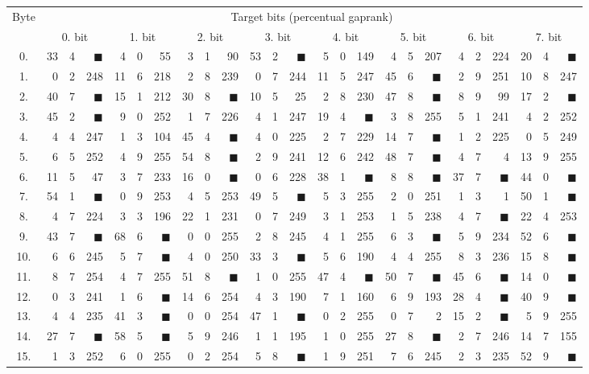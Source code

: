 \begin{tabular}{| c | r@{.} l@{\quad}r | r@{.} l@{\quad}r | r@{.} l@{\quad}r | r@{.} l@{\quad}r | r@{.} l@{\quad}r | r@{.} l@{\quad}r | r@{.} l@{\quad}r | r@{.} l@{\quad}r |}
	\hline
	\multirow{2}{*}{Byte} & \multicolumn{24}{c|}{Target bits (percentual gap\quad rank)} \\
	\cline{2-25}
	~ & \multicolumn{3}{c|}{0. bit} & \multicolumn{3}{c|}{1. bit} & \multicolumn{3}{c|}{2. bit} & \multicolumn{3}{c|}{3. bit} & \multicolumn{3}{c|}{4. bit} & \multicolumn{3}{c|}{5. bit} & \multicolumn{3}{c|}{6. bit} & \multicolumn{3}{c|}{7. bit} \\
	\hline
	0.&33&4&$\blacksquare$&4&0&55&3&1&90&53&2&$\blacksquare$&5&0&149&4&5&207&4&2&224&20&4&$\blacksquare$\\
	\hline
	1.&0&2&248&11&6&218&2&8&239&0&7&244&11&5&247&45&6&$\blacksquare$&2&9&251&10&8&247\\
	\hline
	2.&40&7&$\blacksquare$&15&1&212&30&8&$\blacksquare$&10&5&25&2&8&230&47&8&$\blacksquare$&8&9&99&17&2&$\blacksquare$\\
	\hline
	3.&45&2&$\blacksquare$&9&0&252&1&7&226&4&1&247&19&4&$\blacksquare$&3&8&255&5&1&241&4&2&252\\
	\hline
	4.&4&4&247&1&3&104&45&4&$\blacksquare$&4&0&225&2&7&229&14&7&$\blacksquare$&1&2&225&0&5&249\\
	\hline
	5.&6&5&252&4&9&255&54&8&$\blacksquare$&2&9&241&12&6&242&48&7&$\blacksquare$&4&7&4&13&9&255\\
	\hline
	6.&11&5&47&3&7&233&16&0&$\blacksquare$&0&6&228&38&1&$\blacksquare$&8&8&$\blacksquare$&37&7&$\blacksquare$&44&0&$\blacksquare$\\
	\hline
	7.&54&1&$\blacksquare$&0&9&253&4&5&253&49&5&$\blacksquare$&5&3&255&2&0&251&1&3&1&50&1&$\blacksquare$\\
	\hline
	8.&4&7&224&3&3&196&22&1&231&0&7&249&3&1&253&1&5&238&4&7&$\blacksquare$&22&4&253\\
	\hline
	9.&43&7&$\blacksquare$&68&6&$\blacksquare$&0&0&255&2&8&245&4&1&255&6&3&$\blacksquare$&5&9&234&52&6&$\blacksquare$\\
	\hline
	10.&6&6&245&5&7&$\blacksquare$&4&0&250&33&3&$\blacksquare$&5&6&190&4&4&255&8&3&236&15&8&$\blacksquare$\\
	\hline
	11.&8&7&254&4&7&255&51&8&$\blacksquare$&1&0&255&47&4&$\blacksquare$&50&7&$\blacksquare$&45&6&$\blacksquare$&14&0&$\blacksquare$\\
	\hline
	12.&0&3&241&1&6&$\blacksquare$&14&6&254&4&3&190&7&1&160&6&9&193&28&4&$\blacksquare$&40&9&$\blacksquare$\\
	\hline
	13.&4&4&235&41&3&$\blacksquare$&0&0&254&47&1&$\blacksquare$&0&2&255&0&7&2&15&2&$\blacksquare$&5&9&255\\
	\hline
	14.&27&7&$\blacksquare$&58&5&$\blacksquare$&5&9&246&1&1&195&1&0&255&27&8&$\blacksquare$&2&7&246&14&7&155\\
	\hline
	15.&1&3&252&6&0&255&0&2&254&5&8&$\blacksquare$&1&9&251&7&6&245&2&3&235&52&9&$\blacksquare$\\
	\hline
\end{tabular}